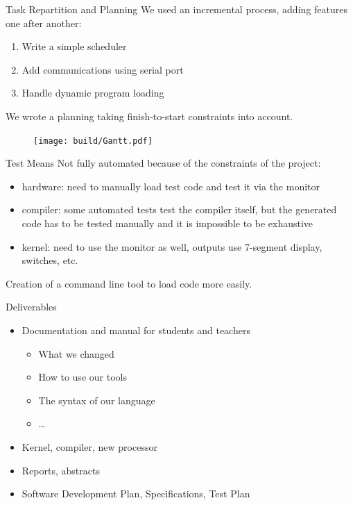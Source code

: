 \documentclass{beamer}
\begin{document}
      \begin{frame}{Task Repartition and Planning}
          We used an incremental process, adding features one after another:%
          \begin{enumerate}
            \item Write a simple scheduler
            \item Add communications using serial port
            \item Handle dynamic program loading
          \end{enumerate}

          We wrote a planning taking finish-to-start constraints into account.
      \end{frame}

      \begin{frame}[plain]
        \begin{figure}
          \texttt{[image: build/Gantt.pdf]}
        \end{figure}
      \end{frame}

      \begin{frame}{Test Means}
        Not fully automated because of the constraints of the project:
        \begin{itemize}
          \item hardware: need to manually load test code and test it via the
            monitor
          \item compiler: some automated tests test the compiler itself, but the
            generated code has to be tested manually and it is impossible to be
            exhaustive
          \item kernel: need to use the monitor as well, outputs use 7-segment
            display, switches, etc.
        \end{itemize}

        Creation of a command line tool to load code more easily.
      \end{frame}

      \begin{frame}{Deliverables}
        \begin{itemize}
          \item Documentation and manual for students and teachers
            \begin{itemize}
              \item What we changed
              \item How to use our tools
              \item The syntax of our language
              \item \dots
            \end{itemize}
          \item Kernel, compiler, new processor
          \item Reports, abstracts
          \item Software Development Plan, Specifications, Test Plan
        \end{itemize}
      \end{frame}
\end{document}
